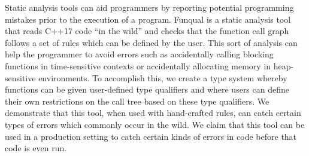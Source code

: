 Static analysis tools can aid programmers by reporting potential programming mistakes prior to the execution of a program.  Funqual is a static analysis tool that reads C++17 code ``in the wild'' and checks that the function call graph follows a set of rules which can be defined by the user.  This sort of analysis can help the programmer to avoid errors such as accidentally calling blocking functions in time-sensitive contexts or accidentally allocating memory in heap-sensitive environments.  To accomplish this, we create a type system whereby functions can be given user-defined type qualifiers and where users can define their own restrictions on the call tree based on these type qualifiers.  We demonstrate that this tool, when used with hand-crafted rules, can catch certain types of errors which commonly occur in the wild.  We claim that this tool can be used in a production setting to catch certain kinds of errors in code before that code is even run.  

